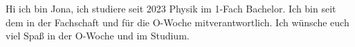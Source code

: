 \begin{multicols}{2}
{
Hi ich bin Jona, ich studiere seit 2023 Physik im 1-Fach Bachelor. Ich bin seit dem in der Fachschaft und für die O-Woche mitverantwortlich. 
Ich wünsche euch viel Spaß in der O-Woche und im Studium. 
}

\vspace{0.5cm}


\end{multicols}

